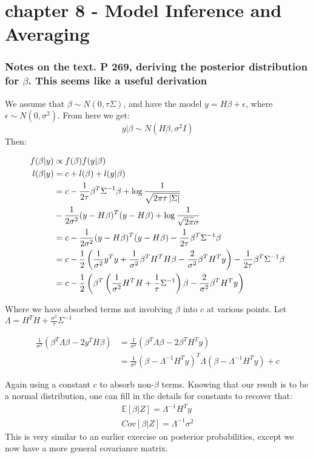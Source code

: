 \chapter{chapter 8 - Model Inference and Averaging}

\subsection*{Notes on the text. P 269, deriving the posterior distribution for $\beta$.
This seems like a useful derivation}

We assume that $\beta \sim N(0, \tau\Sigma)$, and have the model $y = H \beta + \epsilon$, where $\epsilon \sim N(0, \sigma^2)$. From here we get:
$$ y\vert\beta \sim N(H\beta, \sigma^2 I)$$
Then:

\begin{align*}
f(\beta \vert y) &\propto f(\beta) f(y \vert \beta)\\
l(\beta | y) &= c + l(\beta) + l(y \vert \beta) \\
&= c - \frac{1}{2\tau} \beta^T \Sigma^{-1}\beta + \log{\frac{1}{\sqrt{2 \pi \tau \left\vert\Sigma\right\vert}}} \\ 
&-  \frac{1}{2\sigma^2} (y - H\beta)^T  (y - H\beta) + \log{\frac{1}{\sqrt{2\pi} \sigma}}\\ 
&= c - \frac{1}{2\sigma^2} (y - H\beta)^T  (y - H\beta) - \frac{1}{2\tau} \beta^T \Sigma^{-1}\beta \\ 
&= c - \frac{1}{2} \left( \frac{1}{\sigma^2} y^T y +\frac{1}{\sigma^2}  \beta^T H^T  H\beta - \frac{2}{\sigma^2}  \beta^T H^T y\right) - \frac{1}{2\tau} \beta^T \Sigma^{-1}\beta  \\
&= c - \frac{1}{2} \left( \beta^T \left(\frac{1}{\sigma^2}H^T  H + \frac{1}{\tau}\Sigma^{-1}\right) \beta - \frac{2}{\sigma^2} \beta^T H^T y \right) 
\end{align*}

Where we have absorbed terms not involving $\beta$ into $c$ at various points.
Let $\Lambda = H^T H + \frac{\sigma^2}{\tau}\Sigma^{-1}$

\begin{align*}
    \frac{1}{\sigma^2} \left(\beta^T \Lambda \beta - 2 y^T  H \beta \right) &= \frac{1}{\sigma^2} \left(\beta^T \Lambda \beta - 2 \beta^T H^T y\right)\\
    &= \frac{1}{\sigma^2} (\beta - \Lambda^{-1}  H^T y)^T \Lambda(\beta - \Lambda^{-1}  H^T y) + c
\end{align*}  

Again using a constant $c$ to absorb non-$\beta$ terms.
Knowing that our result is to be a normal distribution, one can fill in the details for constants to recover that:
\begin{align*}
    \mathbb{E}\left[\beta\vert Z\right] = \Lambda^{-1}  H^T y\\
    Cov\left[\beta\vert Z\right] = \Lambda^{-1} \sigma^2
\end{align*}
This is very similar to an earlier exercise on posterior probabilities, except we now have a more general covariance matrix. 

